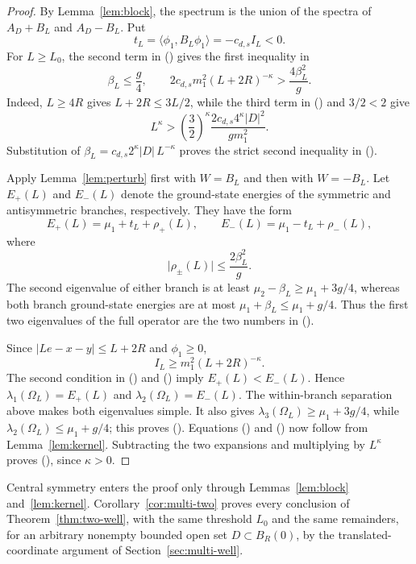 \documentclass[twoside,10pt]{article}
\numberwithin{equation}{section}
\theoremstyle{slbody}
\theoremstyle{definition}
\newcommand{\ip}[2]{\langle #1,#2\rangle}
\newcommand{\abs}[1]{\lvert #1\rvert}
\renewcommand{\eqref}[1]{%
  \textup{{\normalfont(\oldstylenums{\ref{#1}}}\normalfont)}}
\begin{document}
\begin{proof}
By Lemma~\ref{lem:block}, the spectrum is the union of the spectra of
$A_D+B_L$ and $A_D-B_L$.  Put
\[
 t_L=\ip{\phi_1}{B_L\phi_1}=-c_{d,s}I_L<0.
\]
For $L\geq L_0$, the second term in \eqref{eq:explicit-L0} gives the first
inequality in
\begin{equation}\label{eq:L0-conditions}
 \beta_L\leq\frac g4,
 \qquad
 2c_{d,s}m_1^2(L+2R)^{-\kappa}>\frac{4\beta_L^2}{g}.
\end{equation}
Indeed, $L\geq4R$ gives $L+2R\leq3L/2$, while the third term in
\eqref{eq:explicit-L0} and $3/2<2$ give
\[
 L^\kappa>
 \left(\frac32\right)^\kappa
 \frac{2c_{d,s}4^\kappa\abs{D}^2}{gm_1^2}.
\]
Substitution of $\beta_L=c_{d,s}2^\kappa\abs D\,L^{-\kappa}$ proves the
strict second inequality in \eqref{eq:L0-conditions}.

Apply Lemma~\ref{lem:perturb} first with $W=B_L$ and then with $W=-B_L$.
Let $E_+(L)$ and $E_-(L)$ denote the ground-state energies of the symmetric
and antisymmetric branches, respectively.  They have the form
\begin{equation}\label{eq:branches}
 E_+(L)=\mu_1+t_L+\rho_+(L),
 \qquad
 E_-(L)=\mu_1-t_L+\rho_-(L),
\end{equation}
where
\[
 \abs{\rho_\pm(L)}\leq\frac{2\beta_L^2}{g}.
\]
The second eigenvalue of either branch is at least
$\mu_2-\beta_L\geq\mu_1+3g/4$, whereas both branch ground-state energies are
at most $\mu_1+\beta_L\leq\mu_1+g/4$.  Thus the first two eigenvalues of the
full operator are the two numbers in \eqref{eq:branches}.

Since $\abs{Le-x-y}\leq L+2R$ and $\phi_1\geq0$,
\[
 I_L\geq m_1^2(L+2R)^{-\kappa}.
\]
The second condition in \eqref{eq:L0-conditions} and
\eqref{eq:branches} imply $E_+(L)<E_-(L)$.  Hence
$\lambda_1(\Omega_L)=E_+(L)$ and
$\lambda_2(\Omega_L)=E_-(L)$.  The within-branch separation above makes both
eigenvalues simple.  It also gives
$\lambda_3(\Omega_L)\geq\mu_1+3g/4$, while
$\lambda_2(\Omega_L)\leq\mu_1+g/4$; this proves
\eqref{eq:two-well-third-level}.  Equations \eqref{eq:lambda1} and
\eqref{eq:lambda2} now follow from Lemma~\ref{lem:kernel}.  Subtracting the
two expansions and multiplying by $L^\kappa$ proves
\eqref{eq:gap-limit}, since $\kappa>0$.
\end{proof}

Central symmetry enters the proof only through Lemmas~\ref{lem:block}
and~\ref{lem:kernel}.  Corollary~\ref{cor:multi-two} proves every conclusion
of Theorem~\ref{thm:two-well}, with the same threshold $L_0$ and the same
remainders, for an arbitrary nonempty bounded open set $D\subset B_R(0)$, by the
translated-coordinate argument of Section~\ref{sec:multi-well}.
\end{document}
